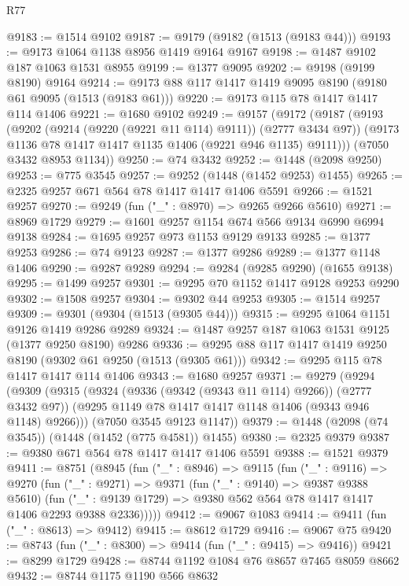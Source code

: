 \begin{lexlean}{R77}
\begin{coremodule}
{{@9183 := @1514 @9102
@9187 := @9179 (@9182 (@1513 (@9183 @44)))
@9193 := @9173 @1064 @1138 @8956 @1419 @9164 @9167
@9198 := @1487 @9102 @187 @1063 @1531 @8955
@9199 := @1377 @9095
@9202 := @9198 (@9199 @8190) @9164
@9214 := @9173 @88 @117 @1417 @1419 @9095 @8190 (@9180 @61 @9095 (@1513 (@9183 @61)))
@9220 := @9173 @115 @78 @1417 @1417 @114 @1406
@9221 := @1680 @9102
@9249 := @9157
    (@9172
      (@9187
        (@9193
          (@9202 (@9214 (@9220 (@9221 @11 @114) @9111)) (@2777 @3434 @97))
          (@9173 @1136 @78 @1417 @1417 @1135 @1406 (@9221 @946 @1135) @9111)))
      (@7050 @3432 @8953 @1134))
@9250 := @74 @3432
@9252 := @1448 (@2098 @9250)
@9253 := @775 @3545
@9257 := @9252 (@1448 (@1452 @9253) @1455)
@9265 := @2325 @9257 @671 @564 @78 @1417 @1417 @1406 @5591
@9266 := @1521 @9257
@9270 := @9249 (fun ("_" : @8970) => @9265 @9266 @5610)
@9271 := @8969 @1729
@9279 := @1601 @9257 @1154 @674 @566 @9134 @6990 @6994 @9138
@9284 := @1695 @9257 @973 @1153 @9129 @9133
@9285 := @1377 @9253
@9286 := @74 @9123
@9287 := @1377 @9286
@9289 := @1377 @1148 @1406
@9290 := @9287 @9289
@9294 := @9284 (@9285 @9290) (@1655 @9138)
@9295 := @1499 @9257
@9301 := @9295 @70 @1152 @1417 @9128 @9253 @9290
@9302 := @1508 @9257
@9304 := @9302 @44 @9253
@9305 := @1514 @9257
@9309 := @9301 (@9304 (@1513 (@9305 @44)))
@9315 := @9295 @1064 @1151 @9126 @1419 @9286 @9289
@9324 := @1487 @9257 @187 @1063 @1531 @9125 (@1377 @9250 @8190) @9286
@9336 := @9295 @88 @117 @1417 @1419 @9250 @8190 (@9302 @61 @9250 (@1513 (@9305 @61)))
@9342 := @9295 @115 @78 @1417 @1417 @114 @1406
@9343 := @1680 @9257
@9371 := @9279
    (@9294
      (@9309
        (@9315
          (@9324 (@9336 (@9342 (@9343 @11 @114) @9266)) (@2777 @3432 @97))
          (@9295 @1149 @78 @1417 @1417 @1148 @1406 (@9343 @946 @1148) @9266)))
      (@7050 @3545 @9123 @1147))
@9379 := @1448 (@2098 (@74 @3545)) (@1448 (@1452 (@775 @4581)) @1455)
@9380 := @2325 @9379
@9387 := @9380 @671 @564 @78 @1417 @1417 @1406 @5591
@9388 := @1521 @9379
@9411 := @8751
    (@8945
      (fun ("_" : @8946) =>
      @9115
        (fun ("_" : @9116) =>
        @9270
          (fun ("_" : @9271) =>
          @9371
            (fun ("_" : @9140) => @9387 @9388 @5610)
            (fun ("_" : @9139 @1729) => @9380 @562 @564 @78 @1417 @1417 @1406 @2293 @9388 @2336)))))
@9412 := @9067 @1083
@9414 := @9411 (fun ("_" : @8613) => @9412)
@9415 := @8612 @1729
@9416 := @9067 @75
@9420 := @8743 (fun ("_" : @8300) => @9414 (fun ("_" : @9415) => @9416))
@9421 := @8299 @1729
@9428 := @8744 @1192 @1084 @76 @8657 @7465 @8059 @8662
@9432 := @8744 @1175 @1190 @566 @8632
}}
\end{coremodule}
\end{lexlean}
